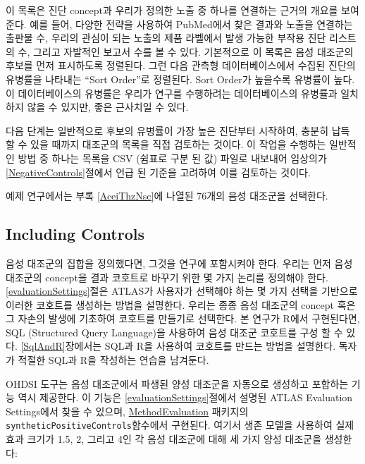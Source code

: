 \documentclass[11pt]{book}
\theoremstyle{definition}
\theoremstyle{definition}
\theoremstyle{definition}
\theoremstyle{remark}
\begin{document}
이 목록은 진단 concept과 우리가 정의한 노출 중 하나를 연결하는 근거의
개요를 보여준다. 예를 들어, 다양한 전략을 사용하여 PubMed에서 찾은
결과와 노출을 연결하는 출판물 수, 우리의 관심이 되는 노출의 제품
라벨에서 발생 가능한 부작용 진단 리스트의 수, 그리고 자발적인 보고서
수를 볼 수 있다. 기본적으로 이 목록은 음성 대조군의 후보를 먼저
표시하도록 정렬된다. 그런 다음 관측형 데이터베이스에서 수집된 진단의
유병률을 나타내는 ``Sort Order''로 정렬된다. Sort Order가 높을수록
유병률이 높다. 이 데이터베이스의 유병률은 우리가 연구를 수행하려는
데이터베이스의 유병률과 일치하지 않을 수 있지만, 좋은 근사치일 수 있다.

다음 단계는 일반적으로 후보의 유병률이 가장 높은 진단부터 시작하여,
충분히 납득 할 수 있을 때까지 대조군의 목록을 직접 검토하는 것이다. 이
작업을 수행하는 일반적인 방법 중 하나는 목록을 CSV (쉼표로 구분 된 값)
파일로 내보내어 임상의가 \ref{NegativeControls}절에서 언급 된 기준을
고려하여 이를 검토하는 것이다.

예제 연구에서는 부록 \ref{AceiThzNsc}에 나열된 76개의 음성 대조군을
선택한다.

\subsection{Including Controls}\label{including-controls}

음성 대조군의 집합을 정의했다면, 그것을 연구에 포함시켜야 한다. 우리는
먼저 음성 대조군의 concept을 결과 코호트로 바꾸기 위한 몇 가지 논리를
정의해야 한다. \ref{evaluationSettings}절은 ATLAS가 사용자가 선택해야
하는 몇 가지 선택을 기반으로 이러한 코호트를 생성하는 방법을 설명한다.
우리는 종종 음성 대조군의 concept 혹은 그 자손의 발생에 기초하여
코호트를 만들기로 선택한다. 본 연구가 R에서 구현된다면, SQL (Structured
Query Language)을 사용하여 음성 대조군 코호트를 구성 할 수 있다.
\ref{SqlAndR}장에서는 SQL과 R을 사용하여 코호트를 만드는 방법을
설명한다. 독자가 적절한 SQL과 R을 작성하는 연습을 남겨둔다.

OHDSI 도구는 음성 대조군에서 파생된 양성 대조군을 자동으로 생성하고
포함하는 기능 역시 제공한다. 이 기능은 \ref{evaluationSettings}절에서
설명된 ATLAS Evaluation Settings에서 찾을 수 있으며,
\href{https://ohdsi.github.io/MethodEvaluation/}{MethodEvaluation}
패키지의 \texttt{syntheticPositiveControls}함수에서 구현된다. 여기서
생존 모델을 사용하여 실제 효과 크기가 1.5, 2, 그리고 4인 각 음성
대조군에 대해 세 가지 양성 대조군을 생성한다:
\end{document}
